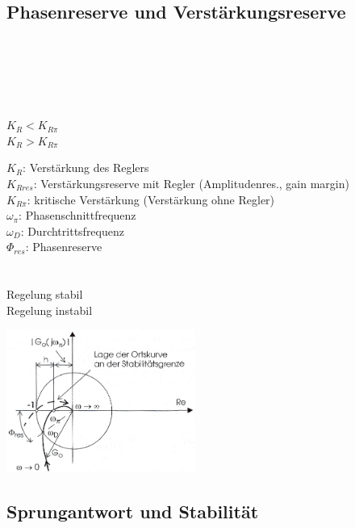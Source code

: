 	\subsection{Phasenreserve und Verstärkungsreserve }
			\begin{minipage}{3.5cm}
			\\
			\\
			\\
			\\
			\\
			$K_R < K_{R\pi}$\\
			$K_R > K_{R\pi}$	
			\end{minipage}
			\begin{minipage}{9cm}
        	$K_R$: \hspace{5mm}Verstärkung des Reglers \\
        	$K_{Rres}$: Verstärkungsreserve mit Regler (Amplitudenres., gain
        	margin)\\ $K_{R\pi}$: kritische Verstärkung (Verstärkung ohne
        	Regler)\\ $\omega_\pi$: Phasenschnittfrequenz \\
        	$\omega_D$: Durchtrittsfrequenz \\
        	$\Phi_{res}$: Phasenreserve \\ \\ \\
        	Regelung stabil\\
        	Regelung instabil
        	\end{minipage}
			\begin{minipage}{6.2cm}
        		\includegraphics[width=6.2cm]{./bilder/phasenreserve.png}
        	\end{minipage}
			
	\subsection{Sprungantwort und Stabilität }
